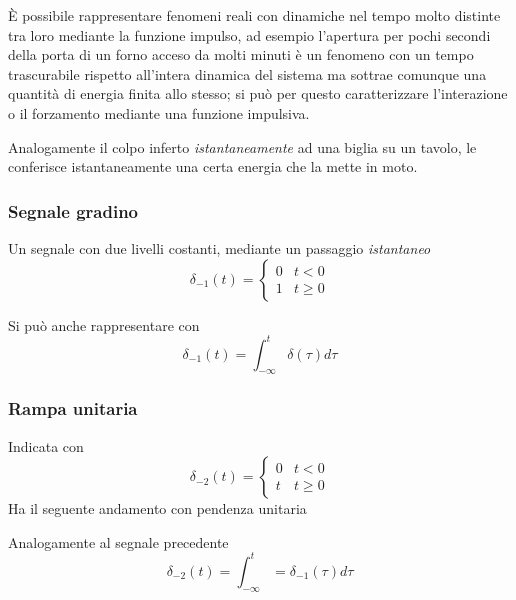 È possibile rappresentare fenomeni reali con dinamiche nel tempo molto
distinte tra loro mediante la funzione impulso, ad esempio l'apertura per
pochi secondi della porta di un forno acceso da molti minuti è un fenomeno con
un tempo trascurabile rispetto all'intera dinamica del sistema ma sottrae
comunque una quantità di energia finita allo stesso; si può per questo
caratterizzare l'interazione o il forzamento mediante una funzione impulsiva.

Analogamente il colpo inferto \textit{istantaneamente} ad una biglia su un
tavolo, le conferisce istantaneamente una certa energia che la mette in moto.

\subsubsection{Segnale gradino}
Un segnale con due livelli costanti, mediante un passaggio \textit{istantaneo}
$$
\delta_{-1}(t) = \begin{cases}
0 & t<0 \\
1 & t \geq 0
\end{cases}
$$
\begin{figure}[h]
\centering
\end{figure}

Si può anche rappresentare con
$$
\delta_{-1}(t) = \int_{-\infty}^{t} \delta(\tau)d\tau
$$

\subsubsection{Rampa unitaria}
Indicata con
$$
\delta_{-2}(t) = \begin{cases}
0 & t<0 \\
t & t\geq 0
\end{cases}
$$
Ha il seguente andamento con pendenza unitaria
\begin{figure}[h]
\centering
\end{figure}
Analogamente al segnale precedente
$$
\delta_{-2}(t) = \int_{-\infty}^{t} = \delta_{-1}(\tau)d\tau
$$


